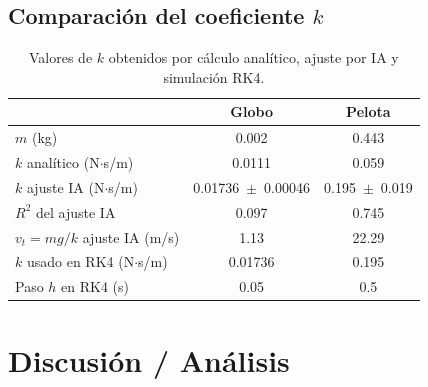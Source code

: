 \documentclass[12pt, journal]{IEEEtran}
\begin{document}
	\subsection{Comparación del coeficiente $k$}

	\begin{table}[H]
		\centering
		\begin{tabular}{lcc}
			\hline
			 & \textbf{Globo} & \textbf{Pelota} \\
			\hline
			$m$ (kg) & 0.002 & 0.443 \\
			$k$ analítico (N$\cdot$s/m) & 0.0111 & 0.059 \\
			$k$ ajuste IA (N$\cdot$s/m) & 0.01736~$\pm$~0.00046 & 0.195~$\pm$~0.019 \\
			$R^2$ del ajuste IA & 0.097 & 0.745 \\
			$v_t = mg/k$ ajuste IA (m/s) & 1.13 & 22.29 \\
			$k$ usado en RK4 (N$\cdot$s/m) & 0.01736 & 0.195 \\
			Paso $h$ en RK4 (s) & 0.05 & 0.5 \\
			\hline
		\end{tabular}
		\caption{Valores de $k$ obtenidos por cálculo analítico, ajuste por IA y simulación RK4.}
		\label{tab:k}
	\end{table}

	\section{Discusión / Análisis}
\end{document}
